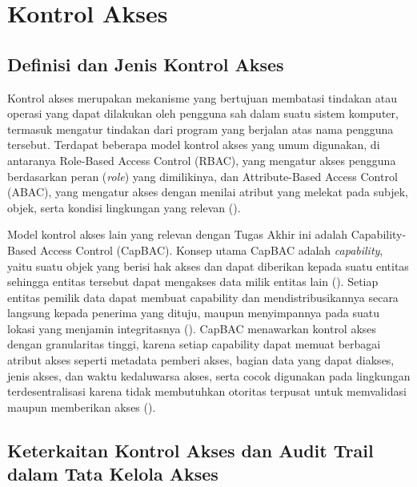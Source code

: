 \section{Kontrol Akses}
\label{sec:kontrol-akses}

\subsection{Definisi dan Jenis Kontrol Akses}
\label{subsec:definisi-jenis-kontrol-akses}

Kontrol akses merupakan mekanisme yang bertujuan membatasi tindakan atau operasi yang dapat dilakukan oleh pengguna sah dalam suatu sistem komputer, termasuk mengatur tindakan dari program yang berjalan atas nama pengguna tersebut. Terdapat beberapa model kontrol akses yang umum digunakan, di antaranya Role-Based Access Control (RBAC), yang mengatur akses pengguna berdasarkan peran (\textit{role}) yang dimilikinya, dan Attribute-Based Access Control (ABAC), yang mengatur akses dengan menilai atribut yang melekat pada subjek, objek, serta kondisi lingkungan yang relevan (\cite{DecMed}).

Model kontrol akses lain yang relevan dengan Tugas Akhir ini adalah Capability-Based Access Control (CapBAC). Konsep utama CapBAC adalah \textit{capability}, yaitu suatu objek yang berisi hak akses dan dapat diberikan kepada suatu entitas sehingga entitas tersebut dapat mengakses data milik entitas lain (\cite{hernandezramos2013capbac}). Setiap entitas pemilik data dapat membuat capability dan mendistribusikannya secara langsung kepada penerima yang dituju, maupun menyimpannya pada suatu lokasi yang menjamin integritasnya (\cite{DecMed}). CapBAC menawarkan kontrol akses dengan granularitas tinggi, karena setiap capability dapat memuat berbagai atribut akses seperti metadata pemberi akses, bagian data yang dapat diakses, jenis akses, dan waktu kedaluwarsa akses, serta cocok digunakan pada lingkungan terdesentralisasi karena tidak membutuhkan otoritas terpusat untuk memvalidasi maupun memberikan akses (\cite{DecMed}).

\subsection{Keterkaitan Kontrol Akses dan Audit Trail dalam Tata Kelola Akses}
\label{subsec:keterkaitan-kontrol-akses-audit-trail}

